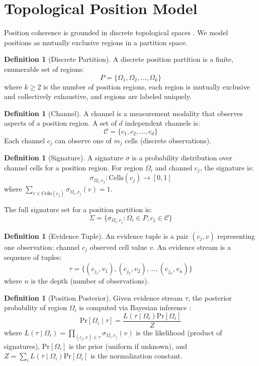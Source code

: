 \documentclass[twocolumn,10pt,a4paper]{article}
\theoremstyle{plain}
\theoremstyle{definition}
\newtheorem{definition}[theorem]{Definition}
\newcommand{\pr}[1]{\mathrm{Pr}\left[#1\right]}
\newcommand{\given}{\mid}
\begin{document}
\section{Topological Position Model}
\label{sec:model}

Position coherence is grounded in discrete topological spaces \cite{munkres2000topology,hatcher2002algebraic}. We model positions as mutually exclusive regions in a partition space.

\begin{definition}[Discrete Partition]
A discrete position partition is a finite, enumerable set of regions:
\[
P = \{\Omega_1, \Omega_2, \ldots, \Omega_k\}
\]
where $k \geq 2$ is the number of position regions, each region is mutually exclusive and collectively exhaustive, and regions are labeled uniquely.
\end{definition}

\begin{definition}[Channel]
A channel is a measurement modality that observes aspects of a position region. A set of $d$ independent channels is:
\[
\mathcal{C} = \{c_1, c_2, \ldots, c_d\}
\]
Each channel $c_j$ can observe one of $m_j$ cells (discrete observations).
\end{definition}

\begin{definition}[Signature]
A signature $\sigma$ is a probability distribution over channel cells for a position region. For region $\Omega_i$ and channel $c_j$, the signature is:
\[
\sigma_{\Omega_i, c_j} : \text{Cells}(c_j) \to [0,1]
\]
where $\sum_{v \in \text{Cells}(c_j)} \sigma_{\Omega_i, c_j}(v) = 1$.

The full signature set for a position partition is:
\[
\Sigma = \{\sigma_{\Omega_i, c_j} : \Omega_i \in P, c_j \in \mathcal{C}\}
\]
\end{definition}

\begin{definition}[Evidence Tuple]
An evidence tuple is a pair $(c_j, v)$ representing one observation: channel $c_j$ observed cell value $v$. An evidence stream is a sequence of tuples:
\[
\tau = \{(c_{j_1}, v_1), (c_{j_2}, v_2), \ldots, (c_{j_n}, v_n)\}
\]
where $n$ is the depth (number of observations).
\end{definition}

\begin{definition}[Position Posterior]
Given evidence stream $\tau$, the posterior probability of region $\Omega_i$ is computed via Bayesian inference \cite{gelman2013bayesian,jaynes2003probability}:
\[
\pr{\Omega_i \given \tau} = \frac{L(\tau \given \Omega_i) \pr{\Omega_i}}{Z}
\]
where $L(\tau \given \Omega_i) = \prod_{(c_j, v) \in \tau} \sigma_{\Omega_i, c_j}(v)$ is the likelihood (product of signatures), $\pr{\Omega_i}$ is the prior (uniform if unknown), and $Z = \sum_{i} L(\tau \given \Omega_i) \pr{\Omega_i}$ is the normalization constant.
\end{definition}
\end{document}
